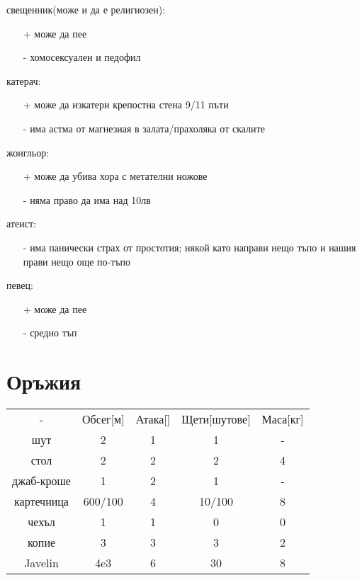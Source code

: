 \documentclass{article}
\begin{document}
свещенник(може и да е религиозен):
\begin{itemize}
\item[+] може да пее
\item[-] хомосексуален и педофил
\end{itemize}


катерач:
\begin{itemize}
\item[+] може да изкатери крепостна стена 9/11 пъти
\item[-] има астма от магнезиая в залата/прахоляка от скалите
\end{itemize}


жонгльор:
\begin{itemize}
\item[+] може да убива хора с метателни ножове
\item[-] няма право да има над 10лв
\end{itemize}


атеист:
\begin{itemize}
\item[-] има панически страх от простотия; някой като направи нещо тъпо и нашия прави нещо още по-тъпо
\end{itemize}


певец:
\begin{itemize}
\item[+] може да пее
\item[-] средно тъп
\end{itemize}


\section{Оръжия}
\begin{tabular}{c | c| c | c | c}
- & Обсег[м] & Атака[]  & Щети[шутове] & Маса[кг]  \\

шут & 2 & 1 & 1 & - \\
стол & 2 & 2 & 2 & 4  \\
джаб-кроше & 1 & 2 & 1 & - \\
картечница & 600/100 & 4 & 10/100 & 8\footnotemark  \\
чехъл & 1 & 1 & 0 & 0  \\
копие & 3 & 3 & 3 & 2  \\
Javelin & 4e3 & 6 & 30\footnotemark & 8 \\
\end{tabular}
\end{document}
